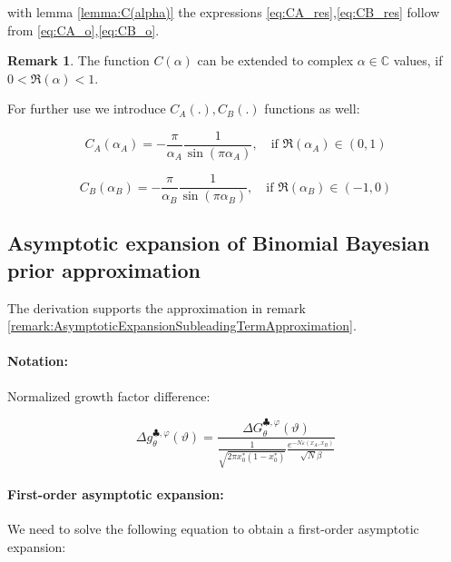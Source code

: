 \documentclass{article}
\theoremstyle{definition}
\newtheorem*{remark}{Remark}
\begin{document}
with lemma \ref{lemma:C(alpha)} the expressions \eqref{eq:CA_res},\eqref{eq:CB_res} follow from \eqref{eq:CA_o},\eqref{eq:CB_o}.

\begin{remark}
    The function $C(\alpha)$ can be extended to complex $\alpha \in \mathbb{C}$ values, if $0<\Re(\alpha)<1$.
    
\end{remark}

For further use we introduce $C_A(.),C_B(.)$ functions as well:

\begin{equation}
    \label{eq:CA_f}
    C_A(\alpha_A) = - \frac{\pi}{\alpha_A} \frac{1}{\sin(\pi \alpha_A)}, \quad \text{if } \Re(\alpha_A) \in (0,1)
\end{equation}

\begin{equation}
    \label{eq:CB_f}
    C_B(\alpha_B) = - \frac{\pi}{\alpha_B} \frac{1}{\sin(\pi \alpha_B)}, \quad \text{if } \Re(\alpha_B) \in (-1,0)
\end{equation}

\subsection{Asymptotic expansion of Binomial Bayesian prior approximation}
\label{sec:AsymptoticExpansionBinomialBayesianPriorApproximation}

The derivation supports the approximation in remark \ref{remark:AsymptoticExpansionSubleadingTermApproximation}.

\paragraph{Notation:}

Normalized growth factor difference:

\begin{equation}
    \Delta g_\theta^{\clubsuit,\varphi}(\vartheta) = 
    \frac{\Delta G_\theta^{\clubsuit,\varphi}(\vartheta)}{
    \frac{1}{\sqrt{2 \pi x_0^* (1-x_0^*)}} \frac{e^{- N \varepsilon(x_A,x_B)}}{\sqrt{N} \beta}
    }
\end{equation}

\paragraph{First-order asymptotic expansion:}

We need to solve the following equation to obtain a first-order asymptotic expansion:
\end{document}
